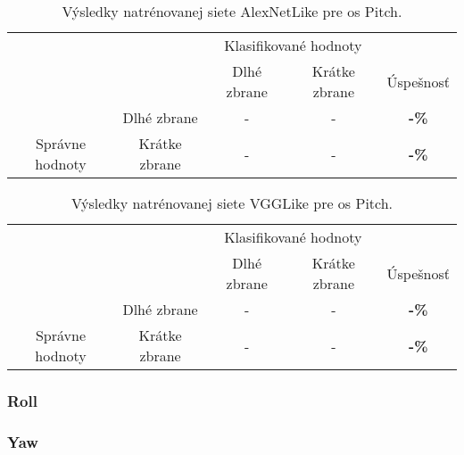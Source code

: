 \begin{table}[H]
    \centering
    \begin{tabular}{ccccc}
                                                                &                                    & \multicolumn{2}{c}{Klasifikované hodnoty}                                                         &                                    \\ \cline{3-5} 
                                                                & \multicolumn{1}{c|}{}              & \multicolumn{1}{c|}{Dlhé zbrane}                & \multicolumn{1}{c|}{Krátke zbrane}              & \multicolumn{1}{c|}{Úspešnosť}     \\ \cline{2-5} 
        \multicolumn{1}{c|}{}                                  & \multicolumn{1}{c|}{Dlhé zbrane}   & \multicolumn{1}{c|}{{\color[HTML]{009901} -}} & \multicolumn{1}{c|}{{\color[HTML]{9A0000} -}}  & \multicolumn{1}{c|}{\textbf{-\%}} \\ \cline{2-5} 
        \multicolumn{1}{c|}{\multirow{-2}{*}{Správne hodnoty}} & \multicolumn{1}{c|}{Krátke zbrane} & \multicolumn{1}{c|}{{\color[HTML]{9A0000} -}}  & \multicolumn{1}{c|}{{\color[HTML]{009901} -}} & \multicolumn{1}{c|}{\textbf{-\%}} \\ \cline{2-5} 
    \end{tabular}
    \caption{Výsledky natrénovanej siete AlexNetLike pre os Pitch.}
    \label{tab:alexnetpitchresults}
\end{table}

\begin{table}[H]
    \centering
    \begin{tabular}{ccccc}
                                                                &                                    & \multicolumn{2}{c}{Klasifikované hodnoty}                                                         &                                    \\ \cline{3-5} 
                                                                & \multicolumn{1}{c|}{}              & \multicolumn{1}{c|}{Dlhé zbrane}                & \multicolumn{1}{c|}{Krátke zbrane}              & \multicolumn{1}{c|}{Úspešnosť}     \\ \cline{2-5} 
        \multicolumn{1}{c|}{}                                  & \multicolumn{1}{c|}{Dlhé zbrane}   & \multicolumn{1}{c|}{{\color[HTML]{009901} -}} & \multicolumn{1}{c|}{{\color[HTML]{9A0000} -}}  & \multicolumn{1}{c|}{\textbf{-\%}} \\ \cline{2-5} 
        \multicolumn{1}{c|}{\multirow{-2}{*}{Správne hodnoty}} & \multicolumn{1}{c|}{Krátke zbrane} & \multicolumn{1}{c|}{{\color[HTML]{9A0000} -}}  & \multicolumn{1}{c|}{{\color[HTML]{009901} -}} & \multicolumn{1}{c|}{\textbf{-\%}} \\ \cline{2-5} 
    \end{tabular}
    \caption{Výsledky natrénovanej siete VGGLike pre os Pitch.}
    \label{tab:vgglikepitchresults}
\end{table}


\subsubsection{Roll}

\subsubsection{Yaw}

